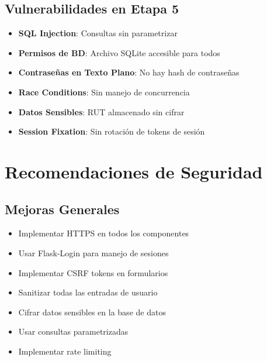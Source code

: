 \subsection{Vulnerabilidades en Etapa 5}
\begin{itemize}
    \item \textbf{SQL Injection}: Consultas sin parametrizar
    \item \textbf{Permisos de BD}: Archivo SQLite accesible para todos
    \item \textbf{Contraseñas en Texto Plano}: No hay hash de contraseñas
    \item \textbf{Race Conditions}: Sin manejo de concurrencia
    \item \textbf{Datos Sensibles}: RUT almacenado sin cifrar
    \item \textbf{Session Fixation}: Sin rotación de tokens de sesión
\end{itemize}

\section{Recomendaciones de Seguridad}

\subsection{Mejoras Generales}
\begin{itemize}
    \item Implementar HTTPS en todos los componentes
    \item Usar Flask-Login para manejo de sesiones
    \item Implementar CSRF tokens en formularios
    \item Sanitizar todas las entradas de usuario
    \item Cifrar datos sensibles en la base de datos
    \item Usar consultas parametrizadas
    \item Implementar rate limiting
\end{itemize}

